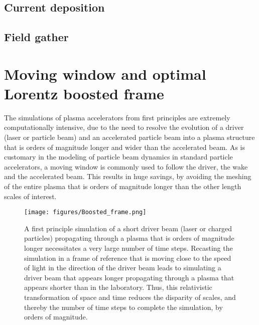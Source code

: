 \documentclass[]{report}
\begin{document}
\subsection{Current deposition}


\subsection{Field gather}


\section{Moving window and optimal Lorentz boosted frame}
The simulations of plasma accelerators from first principles are extremely computationally intensive, due to the need to resolve the evolution of a driver (laser or particle beam) and an accelerated particle beam into a plasma structure that is orders of magnitude longer and wider than the accelerated beam. As is customary in the modeling of particle beam dynamics in standard particle accelerators, a moving window is commonly used to follow the driver, the wake and the accelerated beam. This results in huge savings, by avoiding the meshing of the entire plasma that is orders of magnitude longer than the other length scales of interest.

\begin{figure}
\texttt{[image: figures/Boosted\_frame.png]}
\caption{\label{fig:PIC} A first principle simulation of a short driver beam (laser or charged particles) propagating through a plasma that is orders of magnitude longer necessitates a very large number of time steps. Recasting the simulation in a frame of reference that is moving close to the speed of light in the direction of the driver beam leads to simulating a driver beam that appears longer propagating through a plasma that appears shorter than in the laboratory. Thus, this relativistic transformation of space and time reduces the disparity of scales, and thereby the number of time steps to complete the simulation, by orders of magnitude.}
\end{figure}
\end{document}
